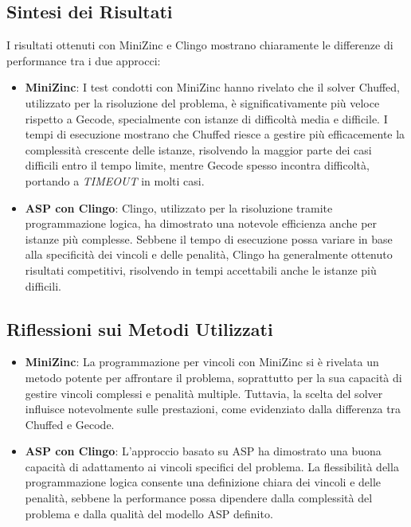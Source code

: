 \documentclass{article}
\begin{document}
\begin{multicols*}{2}
\subsection{Sintesi dei Risultati}

I risultati ottenuti con MiniZinc e Clingo mostrano chiaramente le differenze di performance tra i due approcci:

\begin{itemize}
    \item \textbf{MiniZinc}: I test condotti con MiniZinc hanno rivelato che il solver Chuffed, utilizzato per la risoluzione del problema, è significativamente più veloce rispetto a Gecode, specialmente con istanze di difficoltà media e difficile. I tempi di esecuzione mostrano che Chuffed riesce a gestire più efficacemente la complessità crescente delle istanze, risolvendo la maggior parte dei casi difficili entro il tempo limite, mentre Gecode spesso incontra difficoltà, portando a \textit{TIMEOUT} in molti casi.
    \item \textbf{ASP con Clingo}: Clingo, utilizzato per la risoluzione tramite programmazione logica, ha dimostrato una notevole efficienza anche per istanze più complesse. Sebbene il tempo di esecuzione possa variare in base alla specificità dei vincoli e delle penalità, Clingo ha generalmente ottenuto risultati competitivi, risolvendo in tempi accettabili anche le istanze più difficili.
\end{itemize}

\subsection{Riflessioni sui Metodi Utilizzati}

\begin{itemize}
    \item \textbf{MiniZinc}: La programmazione per vincoli con MiniZinc si è rivelata un metodo potente per affrontare il problema, soprattutto per la sua capacità di gestire vincoli complessi e penalità multiple. Tuttavia, la scelta del solver influisce notevolmente sulle prestazioni, come evidenziato dalla differenza tra Chuffed e Gecode.
    \item \textbf{ASP con Clingo}: L'approccio basato su ASP ha dimostrato una buona capacità di adattamento ai vincoli specifici del problema. La flessibilità della programmazione logica consente una definizione chiara dei vincoli e delle penalità, sebbene la performance possa dipendere dalla complessità del problema e dalla qualità del modello ASP definito.
\end{itemize}


\end{multicols*}
\end{document}
